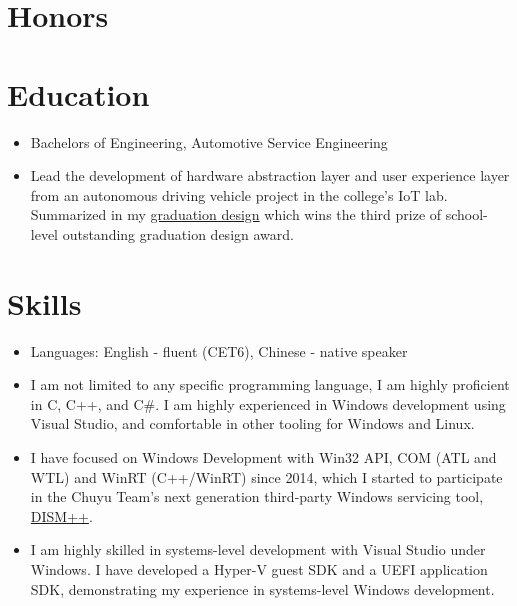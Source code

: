 \documentclass{resume}
\begin{document}
\section{Honors}


\section{Education}

\begin{itemize}
  \item Bachelors of Engineering, Automotive Service Engineering
  \item Lead the development of hardware abstraction layer and user experience layer from an autonomous driving vehicle project in the college's IoT lab. Summarized in my \href{https://mouri.moe/assets/Research%20of%20human-computer%20interaction%20system%20for%20autonomous%20driving.pdf}{graduation design} which wins the third prize of school-level outstanding graduation design award.
\end{itemize}

\section{Skills}
\begin{itemize}
  \item Languages: English - fluent (CET6), Chinese - native speaker
  \item I am not limited to any specific programming language, I am highly proficient in C, C++, and C\#. I am highly experienced in Windows development using Visual Studio, and comfortable in other tooling for Windows and Linux.
  \item I have focused on Windows Development with Win32 API, COM (ATL and WTL) and WinRT (C++/WinRT) since 2014, which I started to participate in the Chuyu Team's next generation third-party Windows servicing tool, \href{https://github.com/Chuyu-Team/Dism-Multi-language/releases/tag/v10.1.1002.2}{DISM++}.
  \item I am highly skilled in systems-level development with Visual Studio under Windows. I have developed a Hyper-V guest SDK and a UEFI application SDK, demonstrating my experience in systems-level Windows development.
\end{itemize}
\end{document}
